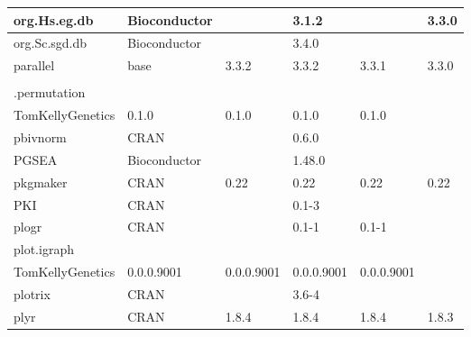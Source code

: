 \begin{longtable}{|llllll|}
org.Hs.eg.db                  & Bioconductor              &             & 3.1.2       &                & 3.3.0             \\ \hline \rowcolor{gray!25}
org.Sc.sgd.db                 & Bioconductor              &             & 3.4.0       &                &                  \\ \hline
parallel                      & base                      & 3.3.2       & 3.3.2       & 3.3.1          & 3.3.0             \\ \hline \rowcolor{gray!25}
\begin{tabular}[c]{@{}l@{}}pathway.structure\\.permutation \end{tabular} & \begin{tabular}[c]{@{}l@{}}GitHub \\ TomKellyGenetics \end{tabular}  & 0.1.0       & 0.1.0       & 0.1.0          & 0.1.0            \\ \hline
pbivnorm                      & CRAN                      &             & 0.6.0       &                &                   \\ \hline \rowcolor{gray!25}
PGSEA                         & Bioconductor              &             & 1.48.0      &                &                  \\ \hline
pkgmaker                      & CRAN                      & 0.22        & 0.22        & 0.22           & 0.22              \\ \hline \rowcolor{gray!25}
PKI                           & CRAN                      &             & 0.1-3       &                &                  \\ \hline
plogr                         & CRAN                      &             & 0.1-1       & 0.1-1          &                   \\ \hline \rowcolor{gray!25}
plot.igraph                   & \begin{tabular}[c]{@{}l@{}}GitHub \\ TomKellyGenetics \end{tabular}  & 0.0.0.9001  & 0.0.0.9001  & 0.0.0.9001     & 0.0.0.9001       \\ \hline
plotrix                       & CRAN                      &             & 3.6-4       &                &                   \\ \hline \rowcolor{gray!25}
plyr                          & CRAN                      & 1.8.4       & 1.8.4       & 1.8.4          & 1.8.3            \\ \hline

\end{longtable}
